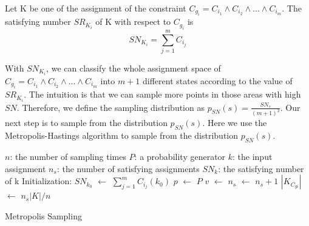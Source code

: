 \begin{definition}[]
      Let K be one of the assignment of the constraint $C_{g_i} = C_{i_1} \land C_{i_2}
      \land ... \land C_{i_m}$. The satisfying number ${SR_{K_{i}}}$ of K with respect to $C_{g_i}$
      is
      $${SN_{K_{i}}} = \sum_{j=1}^{m}C_{i_j}$$
\end{definition}

With ${SN_{K_{i}}}$, we can classify the whole assignment space of $C_{g_i} = C_{i_1} \land C_{i_2} \land ... \land C_{i_m}$ 
into $m + 1$ different states according to the value of ${SR_{K_{i}}}$. The intuition is 
that we can sample more points in those areas with high $SN$. Therefore, we define the sampling
distribution as $p_{SN}(s) = \frac{SN_s}{(m+1)^2}$. Our next step is to sample from the 
distribution $p_{SN}(s)$. Here we use the Metropolis-Hastings algorithm to sample from the
distribution $p_{SN}(s)$.

\IncMargin{1em}
\begin{algorithm}
\SetAlgoLined
\DontPrintSemicolon


$n$: the number of sampling times \;
$P$: a probability generator \;
$k$: the input assignment \;
$n_{s}$: the number of satisfying assignments \;
$SN_k$: the satisfying number of k \; 
Initialization: \;
$SN_{k_0}$ $\leftarrow$ $\sum_{j=1}^{m}C_{i_j}(k_0)$ \;
 {
      $p$ $\leftarrow$ $P$ \;
      {
        $v$ $\leftarrow$  {}
      }
      {$n_{s}$ $\leftarrow$ $n_{s} + 1$}
}
$|K_{C_{gi}}|$ $\leftarrow$ $n_s|K| / n$
\caption{Metropolis Sampling}
\end{algorithm}
\DecMargin{1em}